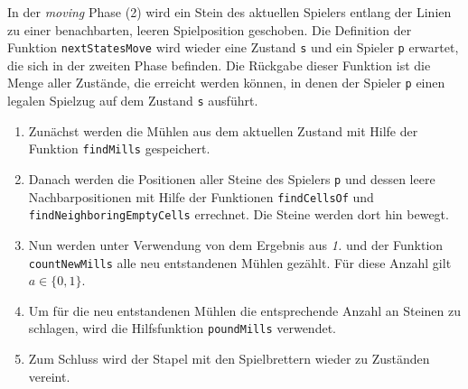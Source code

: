 \documentclass[11pt]{article}
\providecommand{\tightlist}{%
      \setlength{\itemsep}{0pt}\setlength{\parskip}{0pt}}
\begin{document}
    In der \emph{moving} Phase (2) wird ein Stein des aktuellen Spielers
entlang der Linien zu einer benachbarten, leeren Spielposition
geschoben. Die Definition der Funktion \texttt{nextStatesMove} wird
wieder eine Zustand \texttt{s} und ein Spieler \texttt{p} erwartet, die
sich in der zweiten Phase befinden. Die Rückgabe dieser Funktion ist die
Menge aller Zustände, die erreicht werden können, in denen der Spieler
\texttt{p} einen legalen Spielzug auf dem Zustand \texttt{s} ausführt.

\begin{enumerate}
\def\labelenumi{\arabic{enumi}.}
\tightlist
\item
  Zunächst werden die Mühlen aus dem aktuellen Zustand mit Hilfe der
  Funktion \texttt{findMills} gespeichert.
\item
  Danach werden die Positionen aller Steine des Spielers \texttt{p} und
  dessen leere Nachbarpositionen mit Hilfe der Funktionen
  \texttt{findCellsOf} und \texttt{findNeighboringEmptyCells} errechnet.
  Die Steine werden dort hin bewegt.
\item
  Nun werden unter Verwendung von dem Ergebnis aus \emph{1.} und der
  Funktion \texttt{countNewMills} alle neu entstandenen Mühlen gezählt.
  Für diese Anzahl gilt \(a \in \{0,1\}\).
\item
  Um für die neu entstandenen Mühlen die entsprechende Anzahl an Steinen
  zu schlagen, wird die Hilfsfunktion \texttt{poundMills} verwendet.
\item
  Zum Schluss wird der Stapel mit den Spielbrettern wieder zu Zuständen
  vereint.
\end{enumerate}
\end{document}
